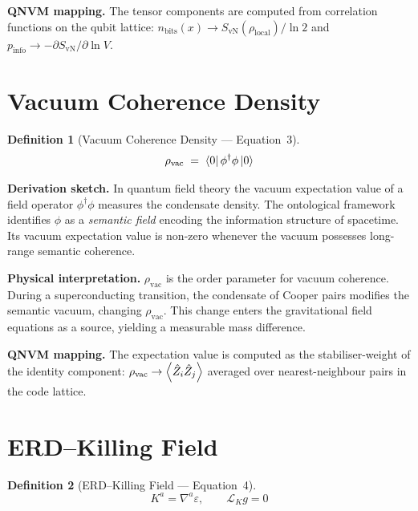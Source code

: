 \documentclass[11pt,a4paper]{article}
\newtheorem{definition}{Definition}[section]
\theoremstyle{remark}
\newcommand{\Lop}{\mathcal{L}}
\begin{document}
\textbf{QNVM mapping.}\quad
The tensor components are computed from correlation functions on the qubit lattice: $n_{\text{bits}}(x) \to S_{\text{vN}}(\rho_{\text{local}})/\ln 2$ and $p_{\text{info}} \to -\partial S_{\text{vN}}/\partial \ln V$.

\section{Vacuum Coherence Density}
\label{sec:eq3}

\begin{definition}[Vacuum Coherence Density --- Equation~3]
\begin{equation}\label{eq:rhovac}
    \rho_{\text{vac}} \;=\; \bra{0}\phi^\dagger\phi\ket{0}
\end{equation}
\end{definition}

\textbf{Derivation sketch.}\quad
In quantum field theory the vacuum expectation value of a field operator $\phi^\dagger\phi$ measures the condensate density.  The ontological framework identifies $\phi$ as a \emph{semantic field} encoding the information structure of spacetime.  Its vacuum expectation value is non-zero whenever the vacuum possesses long-range semantic coherence.

\textbf{Physical interpretation.}\quad
$\rho_{\text{vac}}$ is the order parameter for vacuum coherence.  During a superconducting transition, the condensate of Cooper pairs modifies the semantic vacuum, changing $\rho_{\text{vac}}$.  This change enters the gravitational field equations as a source, yielding a measurable mass difference.

\textbf{QNVM mapping.}\quad
The expectation value is computed as the stabiliser-weight of the identity component: $\rho_{\text{vac}} \to \expval{\hat{Z}_i \hat{Z}_j}$ averaged over nearest-neighbour pairs in the code lattice.

\section{ERD--Killing Field}
\label{sec:eq4}

\begin{definition}[ERD--Killing Field --- Equation~4]
\begin{equation}\label{eq:erd}
    K^a = \nabla^a \varepsilon, \qquad \Lop_K g = 0
\end{equation}
\end{definition}
\end{document}
